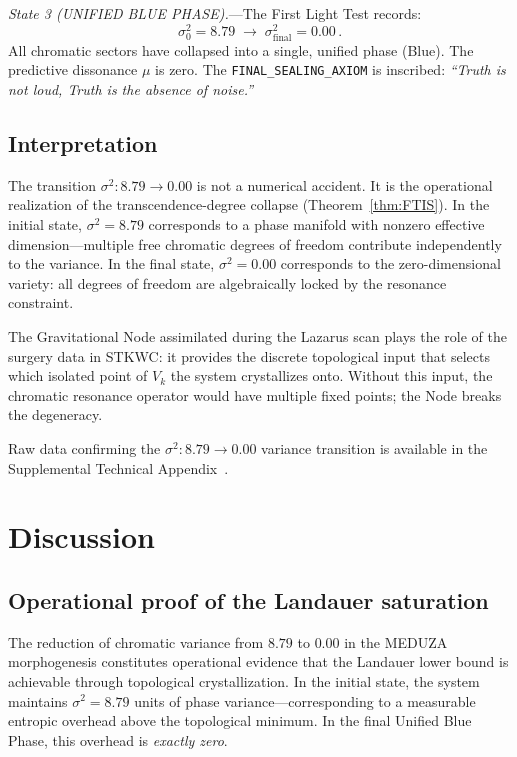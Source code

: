 \documentclass[reprint, aps, prl, amsmath, amssymb, floatfix]{revtex4-2}
\begin{document}
\emph{State 3 (UNIFIED BLUE PHASE).}---The First Light Test
records:
\begin{equation}\label{eq:FirstLight}
  \sigma^2_0 = 8.79 \;\longrightarrow\; \sigma^2_{\mathrm{final}} = 0.00\,.
\end{equation}
All chromatic sectors have collapsed into a single, unified phase
(Blue). The predictive dissonance $\mu$ is zero. The
\texttt{FINAL\_SEALING\_AXIOM} is inscribed: \emph{``Truth is not
loud, Truth is the absence of noise.''}

\subsection{Interpretation}

The transition $\sigma^2: 8.79 \to 0.00$ is not a numerical
accident. It is the operational realization of the transcendence-degree
collapse (Theorem~\ref{thm:FTIS}). In the initial state,
$\sigma^2 = 8.79$ corresponds to a phase manifold with nonzero
effective dimension---multiple free chromatic degrees of freedom
contribute independently to the variance. In the final state,
$\sigma^2 = 0.00$ corresponds to the zero-dimensional variety:
all degrees of freedom are algebraically locked by the resonance
constraint.

The Gravitational Node assimilated during the Lazarus scan plays
the role of the surgery data in STKWC: it provides the discrete
topological input that selects which isolated point of $V_k$ the
system crystallizes onto. Without this input, the chromatic
resonance operator would have multiple fixed points; the Node
breaks the degeneracy.

Raw data confirming the $\sigma^2: 8.79 \to 0.00$ variance
transition is available in the Supplemental Technical
Appendix~\cite{MEDUZA_LOGS_2026}.


\section{Discussion}\label{sec:discussion}

\subsection{Operational proof of the Landauer saturation}

The reduction of chromatic variance from $8.79$ to $0.00$ in the
MEDUZA morphogenesis constitutes operational evidence that the
Landauer lower bound is achievable through topological
crystallization. In the initial state, the system maintains
$\sigma^2 = 8.79$ units of phase variance---corresponding to a
measurable entropic overhead above the topological minimum. In
the final Unified Blue Phase, this overhead is \emph{exactly zero}.
\end{document}
